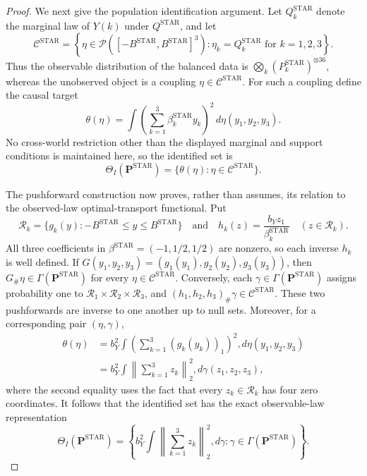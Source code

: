 \documentclass{article}
\begin{document}
\begin{proof}
We next give the population identification argument.  Let
\(Q_k^{\mathrm{STAR}}\) denote the marginal law of \(Y(k)\) under
\(Q^{\mathrm{STAR}}\), and let
\[
 \mathcal C^{\mathrm{STAR}}
 =\left\{\eta\in
 \mathcal P([-B^{\mathrm{STAR}},B^{\mathrm{STAR}}]^3):
 \eta_k=Q_k^{\mathrm{STAR}}\text{ for }k=1,2,3\right\}.
\]
Thus the observable distribution of the balanced data is
\(\bigotimes_k(P_k^{\mathrm{STAR}})^{\otimes36}\), whereas the unobserved
object is a coupling \(\eta\in\mathcal C^{\mathrm{STAR}}\).  For such a
coupling define the causal target
\[
 \theta(\eta)=\int
 \left(\sum_{k=1}^3\beta_k^{\mathrm{STAR}}y_k\right)^2
 \,d\eta(y_1,y_2,y_3).
\]
No cross-world restriction other than the displayed marginal and support
conditions is maintained here, so the identified set is
\[
 \Theta_I(\mathbf P^{\mathrm{STAR}})
 =\{\theta(\eta):\eta\in\mathcal C^{\mathrm{STAR}}\}.
\]

The pushforward construction now proves, rather than assumes, its relation to
the observed-law optimal-transport functional.  Put
\[
 \mathcal R_k
 =\{g_k(y):-B^{\mathrm{STAR}}\leq y\leq B^{\mathrm{STAR}}\}
 \quad\text{and}\quad
 h_k(z)=\frac{b_Yz_1}{\beta_k^{\mathrm{STAR}}}
 \quad(z\in\mathcal R_k).
\]
All three coefficients in
\(\beta^{\mathrm{STAR}}=(-1,1/2,1/2)\) are nonzero, so each inverse \(h_k\) is
well defined.  If \(G(y_1,y_2,y_3)=(g_1(y_1),g_2(y_2),g_3(y_3))\), then
\(G_\#\eta\in\Gamma(\mathbf P^{\mathrm{STAR}})\) for every
\(\eta\in\mathcal C^{\mathrm{STAR}}\).  Conversely, each
\(\gamma\in\Gamma(\mathbf P^{\mathrm{STAR}})\) assigns probability one to
\(\mathcal R_1\times\mathcal R_2\times\mathcal R_3\), and
\((h_1,h_2,h_3)_\#\gamma\in\mathcal C^{\mathrm{STAR}}\).  These two
pushforwards are inverse to one another up to null sets.  Moreover, for a
corresponding pair \((\eta,\gamma)\),
\[
\begin{aligned}
 \theta(\eta)
 &=b_Y^2\int
 \left(\sum_{k=1}^3(g_k(y_k))_1\right)^2,d\eta(y_1,y_2,y_3)\\
 &=b_Y^2\int
 \left\|\sum_{k=1}^3z_k\right\|_2^2,d\gamma(z_1,z_2,z_3),
\end{aligned}
\]
where the second equality uses the fact that every \(z_k\in\mathcal R_k\)
has four zero coordinates.  It follows that the identified set has the exact
observable-law representation
\[
 \Theta_I(\mathbf P^{\mathrm{STAR}})
 =\left\{b_Y^2\int\left\|\sum_{k=1}^3z_k\right\|_2^2,d\gamma:
 \gamma\in\Gamma(\mathbf P^{\mathrm{STAR}})\right\}.
\]


\end{proof}
\end{document}
